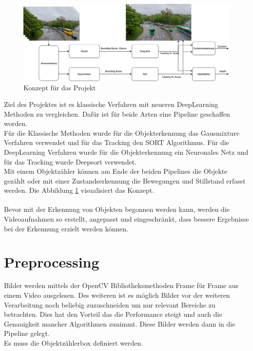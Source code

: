 \documentclass[conference]{IEEEtran}
\begin{document}
	\begin{figure}[!h]
		\begin{center}
			\includegraphics[width=16cm]{Media/KonzeptVAOT.png}
			\caption{Konzept für das Projekt}
			\label{Konzept}
		\end{center}
	\end{figure}
	Ziel des Projektes ist es klassische Verfahren mit neueren DeepLearning Methoden zu vergleichen.
	Dafür ist für beide Arten eine Pipeline geschaffen worden.\\
	Für die Klassische Methoden wurde für die Objekterkennung das Gausmixture Verfahren verwendet und für das Tracking den SORT Algorithmus. Für die DeepLearning Verfahren wurde für die Objekterkennung ein Neuronales Netz  und für das Tracking wurde Deepsort verwendet.\\
	Mit einem Objektzähler können am Ende der beiden Pipelines die Objekte gezählt oder mit einer Zustandserkennung die Bewegungen und Stillstand erfasst werden. Die Abbildung \ref{Konzept} visualisiert das Konzept.\\
	\\
	Bevor mit der Erkennung von Objekten begonnen werden kann, werden die Videoaufnahmen so erstellt, angepasst und eingeschränkt, dass bessere Ergebnisse bei der Erkennung erzielt werden können.
	\section{Preprocessing}
	Bilder werden mittels der OpenCV Bibliotheksmethoden Frame für Frame aus einem Video ausgelesen. Des weiteren ist es möglich Bilder vor der weiteren Verarbeitung noch beliebig zuzuschneiden um nur relevant Bereiche zu betrachten. Dies hat den Vorteil das die Performance steigt und auch die Genauigkeit mancher Algorithmen zunimmt. Diese Bilder werden dann in die Pipeline gelegt.\\
	Es muss die Objektzählerbox definiert werden.
\end{document}
